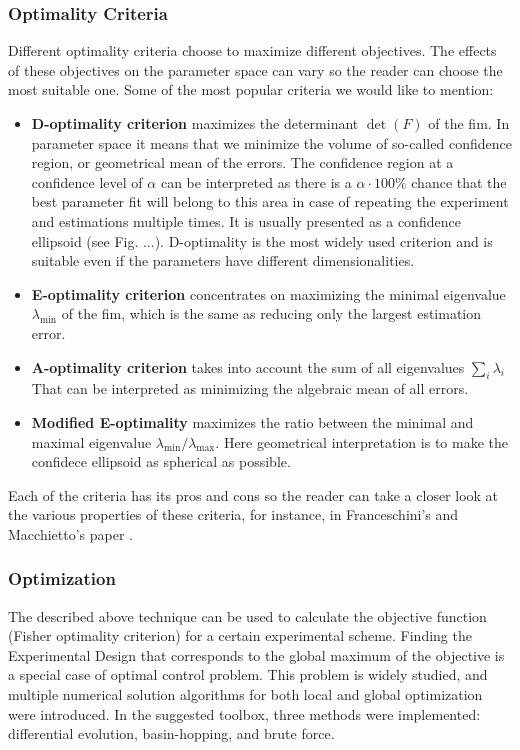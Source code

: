 \documentclass[10pt,A4paper]{article}
\begin{document}
\subsubsection*{Optimality Criteria}
Different optimality criteria choose to maximize different objectives.
The effects of these objectives on the parameter space can vary so the reader can choose the most suitable one. 
Some of the most popular criteria we would like to mention:
\begin{itemize}
    \item \textbf{D-optimality criterion} maximizes the determinant $\det (F)$ of the \ac{fim}. 
    In parameter space it means that we minimize the volume of so-called confidence region, or geometrical mean of the errors.
    The confidence region at a confidence level of $\alpha$ can be interpreted as there is a $\alpha \cdot 100 \%$ chance that the best parameter fit will belong to this area in case of repeating the experiment and estimations multiple times.
    It is usually presented as a confidence ellipsoid (see Fig. ...).
    D-optimality is the most widely used criterion and is suitable even if the parameters have different dimensionalities.
    
    \item \textbf{E-optimality criterion} concentrates on maximizing the minimal eigenvalue $\lambda_{\min}$ of the \ac{fim}, which is the same as reducing only the largest estimation error.
    
    \item \textbf{A-optimality criterion} takes into account the sum of all eigenvalues $\sum_i \lambda_i$
    That can be interpreted as minimizing the algebraic mean of all errors.
    
    \item \textbf{Modified E-optimality} maximizes the ratio between the minimal and maximal eigenvalue $\lambda_{\min} / \lambda_{\max}$.
    Here geometrical interpretation is  to make the confidece ellipsoid as spherical as possible.
    
\end{itemize}
Each of the criteria has its pros and cons so the reader can take a closer look at the various properties of these criteria, for instance, in Franceschini's and Macchietto's paper \cite{franceschiniModelbasedDesignExperiments2008}.
%
%
\subsubsection*{Optimization}
The described above technique can be used to calculate the objective function (Fisher optimality criterion) for a certain experimental scheme.
Finding the Experimental Design that corresponds to the global maximum of the objective is a special case of optimal control problem.
This problem is widely studied, and multiple numerical solution algorithms for both local and global optimization were introduced.
In the suggested toolbox, three methods were implemented: differential evolution, basin-hopping, and brute force.
\end{document}
